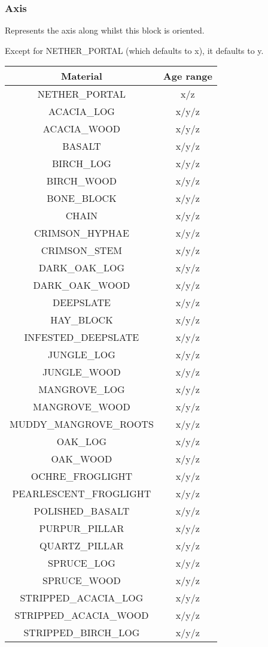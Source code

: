 \subsubsection{Axis}
Represents the axis along whilst this block is oriented.

Except for NETHER\_PORTAL (which defaults to x), it defaults to y.

\begin{longtable}{ |c|c| }
	\hline
	Material & Age range \\
	\hline
	\endhead
	NETHER\_PORTAL & x/z \\
	ACACIA\_LOG & x/y/z \\
	ACACIA\_WOOD & x/y/z \\
	BASALT & x/y/z \\
	BIRCH\_LOG & x/y/z \\
	BIRCH\_WOOD & x/y/z \\
	BONE\_BLOCK & x/y/z \\
	CHAIN & x/y/z \\
	CRIMSON\_HYPHAE & x/y/z \\
	CRIMSON\_STEM & x/y/z \\
	DARK\_OAK\_LOG & x/y/z \\
	DARK\_OAK\_WOOD & x/y/z \\
	DEEPSLATE & x/y/z \\
	HAY\_BLOCK & x/y/z \\
	INFESTED\_DEEPSLATE & x/y/z \\
	JUNGLE\_LOG & x/y/z \\
	JUNGLE\_WOOD & x/y/z \\
	MANGROVE\_LOG & x/y/z \\
	MANGROVE\_WOOD & x/y/z \\
	MUDDY\_MANGROVE\_ROOTS & x/y/z \\
	OAK\_LOG & x/y/z \\
	OAK\_WOOD & x/y/z \\
	OCHRE\_FROGLIGHT & x/y/z \\
	PEARLESCENT\_FROGLIGHT & x/y/z \\
	POLISHED\_BASALT & x/y/z \\
	PURPUR\_PILLAR & x/y/z \\
	QUARTZ\_PILLAR & x/y/z \\
	SPRUCE\_LOG & x/y/z \\
	SPRUCE\_WOOD & x/y/z \\
	STRIPPED\_ACACIA\_LOG & x/y/z \\
	STRIPPED\_ACACIA\_WOOD & x/y/z \\
	STRIPPED\_BIRCH\_LOG & x/y/z \\

\end{longtable}
